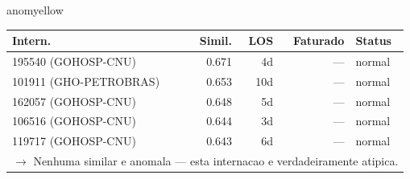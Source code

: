 \documentclass[a4paper,10pt]{article}
\begin{document}
\begin{anomalycard}[Internacao 120314 | GHO-BRADESCO | MODERADO (z=2.14)]{anomyellow}
\begin{tabular}{l r r r l}\toprule\textbf{Intern.} & \textbf{Simil.} & \textbf{LOS} & \textbf{Faturado} & \textbf{Status} \\\midrule
195540 (GOHOSP-CNU) & 0.671 & 4d & --- & \textcolor{jcubeblue}{normal} \\
101911 (GHO-PETROBRAS) & 0.653 & 10d & --- & \textcolor{jcubeblue}{normal} \\
162057 (GOHOSP-CNU) & 0.648 & 5d & --- & \textcolor{jcubeblue}{normal} \\
106516 (GOHOSP-CNU) & 0.644 & 3d & --- & \textcolor{jcubeblue}{normal} \\
119717 (GOHOSP-CNU) & 0.643 & 6d & --- & \textcolor{jcubeblue}{normal} \\
\multicolumn{5}{l}{\textcolor{jcubeblue}{\small $\rightarrow$ Nenhuma similar e anomala --- esta internacao e verdadeiramente atipica.}} \\
\bottomrule\end{tabular}


\end{anomalycard}

\newpage
\end{document}
